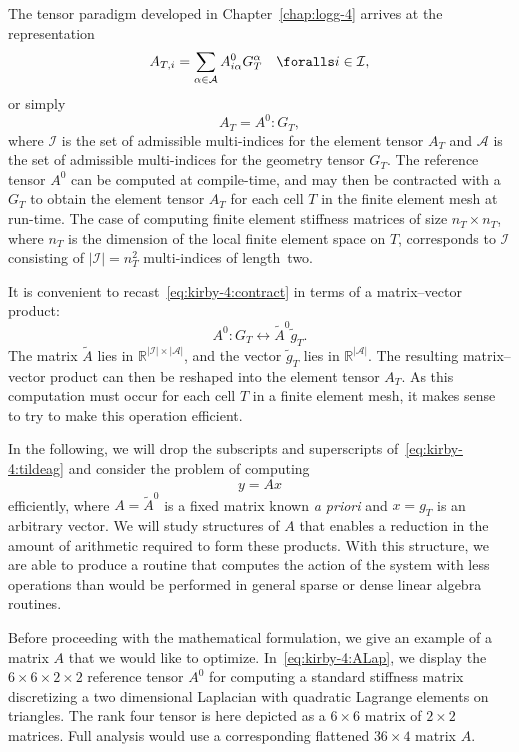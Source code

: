 The tensor paradigm developed in Chapter~\ref{chap:logg-4} arrives at the
representation
\begin{displaymath}
  A_{T,i} = \sum_{\alpha\in\mathcal{A}} A^0_{i\alpha} G_T^{\alpha}
  \quad \foralls i \in \mathcal{I},
\end{displaymath}
or simply
\begin{equation} \label{eq:kirby-4:contract}
  A_T = A^0 : G_T,
\end{equation}
where $\mathcal{I}$ is the set of admissible multi-indices for the
element tensor $A_T$ and $\mathcal{A}$ is the set of admissible
multi-indices for the geometry tensor $G_T$. The reference tensor $
A^0 $ can be computed at compile-time, and may then be contracted with
a $ G_T $ to obtain the element tensor $A_T$ for each cell $T$ in
the finite element mesh at run-time. The case of computing finite
element stiffness matrices of size $n_T \times n_T$, where $n_T$ is
the dimension of the local finite element space on $T$, corresponds to
$ \mathcal{I} $ consisting of $|\mathcal{I}| = n_T^2$ multi-indices of
length~two.

It is convenient to recast~\eqref{eq:kirby-4:contract} in terms of a
matrix--vector product:
\begin{equation} \label{eq:kirby-4:tildeag}
  A^0 : G_T \leftrightarrow \tilde{A}^0 \tilde{g}_T.
\end{equation}
The matrix $ \tilde{A} $ lies in $ \mathbb{R}^{|\mathcal{I}| \times
  |\mathcal{A}|} $, and the vector $ \tilde{g}_{T} $ lies in $
\mathbb{R}^{|\mathcal{A}|} $. The resulting matrix--vector product can
then be reshaped into the element tensor $A_T$. As this computation
must occur for each cell $T$ in a finite element mesh, it makes
sense to try to make this operation efficient.

In the following, we will drop the subscripts and superscripts
of~\eqref{eq:kirby-4:tildeag} and consider the problem of computing
\begin{equation}
y = A x
\end{equation}
efficiently, where $ A = \tilde{A}^0 $ is a fixed matrix known \emph{a
  priori} and $ x = g_T $ is an arbitrary vector. We will study
structures of $ A $ that enables a reduction in the amount of
arithmetic required to form these products.  With this structure, we
are able to produce a routine that computes the action of the system
with less operations than would be performed in general sparse or
dense linear algebra routines.

Before proceeding with the mathematical formulation, we give an
example of a matrix $ A $ that we would like to
optimize. In~\eqref{eq:kirby-4:ALap}, we display the $6 \times 6
\times 2 \times 2$ reference tensor $A^0$ for computing a standard
stiffness matrix discretizing a two dimensional Laplacian with
quadratic Lagrange elements on triangles. The rank four tensor is here
depicted as a $6 \times 6$ matrix of $2 \times 2$ matrices. Full
analysis would use a corresponding flattened $36 \times 4$ matrix $A$.

